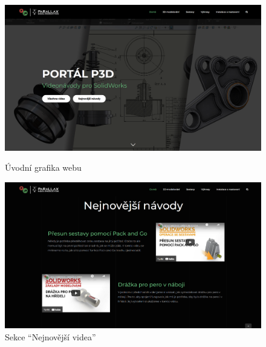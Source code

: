 \begin{figure}[htbp]
    \centering
    \begin{minipage}[b]{0.45\textwidth}
        \centering
        \includegraphics[width=1\textwidth]{img/020/web/web-hp1.png}
        \caption{Úvodní grafika webu}
        \label{fig:p3dportal-hp1}
    \end{minipage}
    \qquad
    \begin{minipage}[b]{0.45\textwidth}
        \centering
        \includegraphics[width=1\textwidth]{img/020/web/web-hp2.png}
        \caption{Sekce \enquote{Nejnovější videa}}
        \label{fig:p3dportal-hp2}
    \end{minipage}
\end{figure}


